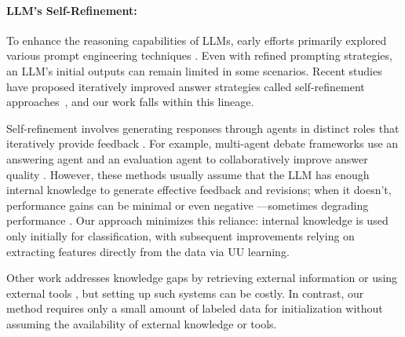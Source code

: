 \paragraph{LLM's Self-Refinement:}
To enhance the reasoning capabilities of LLMs, early efforts primarily explored various prompt engineering techniques \citep{Brown2020-bw,Wei2022-kt,Wang2023-pf,Yao2023-ey}. Even with refined prompting strategies, an LLM’s initial outputs can remain limited in some scenarios. Recent studies have proposed iteratively improved answer strategies called self-refinement approaches~\citep{Madaan2023-fn,Kim2023-zz,Chen2024-zm}, and our work falls within this lineage.

Self-refinement involves generating responses through agents in distinct roles that iteratively provide feedback \citep{Shinn2023-no, Zhu2023-wn}. For example, multi-agent debate frameworks \citep{Estornell2024-gh} use an answering agent and an evaluation agent to collaboratively improve answer quality \citep{Chen2024-ua, Du2024-pi, Smit2024-cn}. However, these methods usually assume that the LLM has enough internal knowledge to generate effective feedback and revisions; when it doesn’t, performance gains can be minimal or even negative \citep{Huang2024-co,Li2024-fo,Kamoi2024-lc,Kamoi2024-od}—sometimes degrading performance \citep{Huang2024-co}. Our approach minimizes this reliance: internal knowledge is used only initially for classification, with subsequent improvements relying on extracting features directly from the data via UU learning.

Other work addresses knowledge gaps by retrieving external information or using external tools \citep{Huang2022-mv, Wang2023-fz, Shi2024-gx, Wu2024-cb}, but setting up such systems can be costly. In contrast, our method requires only a small amount of labeled data for initialization without assuming the availability of external knowledge or tools.
